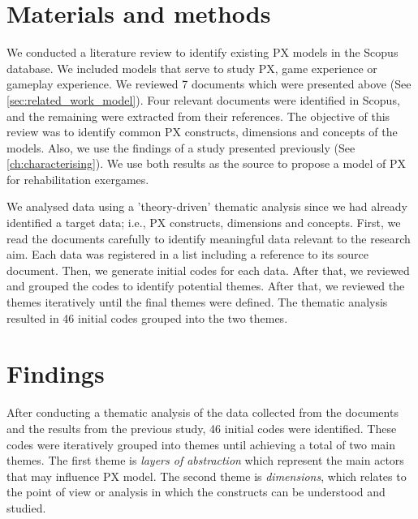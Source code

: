 \section{Materials and methods} %
\label{sec:mats_mets_model}
We conducted a literature review to identify existing \ac{PX} models in the Scopus database. We included models that serve to study \ac{PX}, game experience or gameplay experience. We reviewed 7 documents which were presented above (See \autoref{sec:related_work_model}). Four relevant documents were identified in Scopus, and the remaining were extracted from their references. The objective of this review was to identify common \ac{PX} constructs, dimensions and concepts of the models. Also, we use the findings of a study presented previously (See \autoref{ch:characterising}). We use both results as the source to propose a model of \ac{PX} for rehabilitation exergames.

We analysed data using a 'theory-driven' thematic analysis \autocite{Braun} since we had already identified a target data; i.e., \ac{PX} constructs, dimensions and concepts. First, we read the documents carefully to identify meaningful data relevant to the research aim. Each data was registered in a list including a reference to its source document. Then, we generate initial codes for each data. After that, we reviewed and grouped the codes to identify potential themes. After that, we reviewed the themes iteratively until the final themes were defined. The thematic analysis resulted in 46 initial codes grouped into the two themes.

\section{Findings} %
\label{sec:findings_model}
After conducting a thematic analysis of the data collected from the documents and the results from the previous study, 46 initial codes were identified. These codes were iteratively grouped into themes until achieving a total of two main themes. The first theme is \textit{layers of abstraction} which represent the main actors that may influence \ac{PX} model. The second theme is \textit{dimensions}, which relates to the point of view or analysis in which the constructs can be understood and studied. 

